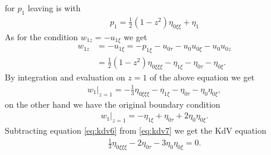 for $p_1$ leaving is with
\begin{align}
    p_1 = \frac{1}{2} \left( 1-z^2 \right)  \eta_{0\xi\xi} +\eta_1
\end{align}
As for the condition $w_{1z} = -u_{1\xi}$ we get
\begin{align}
    w_{1z} &= -u_{1\xi} = -p_{1\xi} - u_{0\tau} - u_0u_{0\xi} - u_0u_{0z} \\
    &=\frac{1}{2} (1-z^2)\eta_{0\xi\xi\xi} - \eta_{1\xi} -\eta_{0\tau}
    -\eta_{0\xi}.
\end{align}
By integration and evaluation on $z=1$ of the above equation we get
\begin{align}\label{eq:kdv6}
    w_1\Big|_{z=1} = -\frac{1}{3} \eta_{0\xi\xi\xi} - \eta_{1\xi} -
    \eta_{0\tau} -\eta_0\eta_{0\xi},
\end{align}
on the other hand we have the original boundary condition
\begin{align}\label{eq:kdv7}
    w_1\Big|_{z=1} = -\eta_{1\xi} + \eta_{0\tau} +2\eta_{0}\eta_{0\xi} .
\end{align}
Subtracting equation \ref{eq:kdv6} from \ref{eq:kdv7} we get the KdV equation
\begin{align}
    \frac{1}{3} \eta_{0\xi\xi\xi} - 2\eta_{0\tau} - 3\eta_0\eta_{0\xi} = 0.
\end{align}





